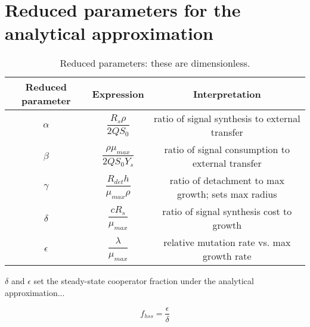 \documentclass[11pt]{amsart}
\begin{document}
	\section{Reduced parameters for the analytical approximation}
		\begin{center}
			\begin{table}[h]
				\caption{Reduced parameters: these are dimensionless.}
				\renewcommand{\arraystretch}{4}
				\begin{tabular}{c | c | c}
					Reduced parameter & Expression & Interpretation \\
					\hline 
					\(\alpha\) & \(\dfrac{R_s\rho}{2QS_0}\) & ratio of signal synthesis to external transfer \\
					\(\beta\) & \(\dfrac{\rho\mu_{max}}{2QS_0Y_s}\) & ratio of signal consumption to external transfer \\
					\(\gamma\) & \(\dfrac{R_{det}h}{\mu_{max}\rho}\) & ratio of detachment to max growth; sets max radius \\
					\(\delta\) & \(\dfrac{cR_s}{\mu_{max}} \)& ratio of signal synthesis cost to growth \\
					\(\epsilon\) & \(\dfrac{\lambda}{\mu_{max}}\) & relative mutation rate vs. max growth rate \\
				\end{tabular}
			\end{table}
		\end{center}
		\begin{flushleft}
			\(\delta\) and \(\epsilon\) set the steady-state cooperator fraction under the analytical approximation... \\
		\end{flushleft}
		\begin{center}
			\[
			f_{hss} = \dfrac{\epsilon}{\delta}
			\]
		\end{center}

	
\end{document}
